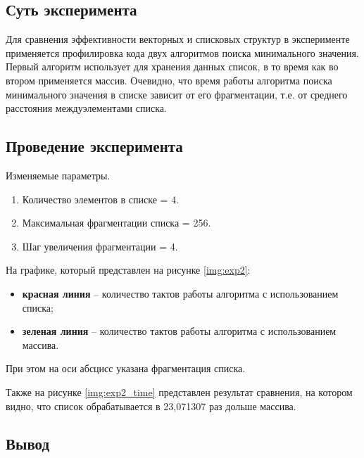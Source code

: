 \subsection{Суть эксперимента}  
Для сравнения эффективности векторных и списковых структур в эксперименте применяется профилировка кода двух алгоритмов поиска минимального значения. Первый алгоритм использует для хранения данных список, в то время как во втором применяется массив. Очевидно, что время работы алгоритма поиска минимального значения в списке зависит от его фрагментации, т.е. от среднего расстояния междуэлементами   списка. 


\subsection{Проведение эксперимента}

Изменяемые параметры.

\begin{enumerate}
	\item Количество элементов в списке = 4.
	\item Максимальная фрагментации списка = 256.
	\item Шаг увеличения фрагментации = 4.
\end{enumerate}

На графике, который представлен на рисунке \ref{img:exp2}:
\begin{itemize}
	\item \textbf{красная линия} -- количество тактов работы алгоритма с использованием списка;
	\item \textbf{зеленая линия} -- количество тактов работы алгоритма с использованием массива.
\end{itemize}

При этом на оси абсцисс указана фрагментация списка.



\clearpage


Также на рисунке \ref{img:exp2_time} представлен результат сравнения, на котором видно, что список обрабатывается в 23,071307 раз дольше массива.



\subsection{Вывод}

